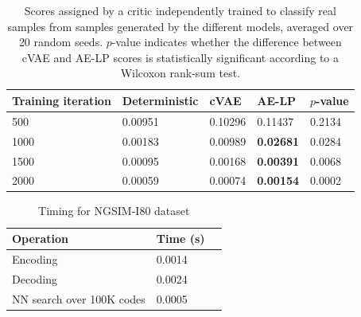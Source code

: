 \documentclass{article}
\begin{document}
\begin{table}
  \caption{Scores assigned by a critic independently trained to classify real samples from samples generated by the different models, averaged over 20 random seeds. $p$-value indicates whether the difference between cVAE and AE-LP scores is statistically significant according to a Wilcoxon rank-sum test.}
  \label{sample-table}
  \centering
  \begin{tabular}{l|l|lll}
    \toprule
    Training iteration     & Deterministic & cVAE & AE-LP & $p$-value \\
    \midrule
    500 & 0.00951 & 0.10296 & 0.11437 & 0.2134 \\
    1000 & 0.00183 & 0.00989 & \textbf{0.02681} & 0.0284 \\
    1500 & 0.00095 & 0.00168 & \textbf{0.00391} & 0.0068 \\
    2000 & 0.00059 & 0.00074 & \textbf{0.00154} & 0.0002 \\
    \bottomrule
  \end{tabular}
\end{table}


\begin{table}
  \caption{Timing for NGSIM-I80 dataset}
  \label{sample-table}
  \centering
  \begin{tabular}{lll}
    \toprule
    Operation     & Time (s) \\
    \midrule
    Encoding & 0.0014  \\
    Decoding     & 0.0024 \\
    NN search over 100K codes & 0.0005      \\
    \bottomrule
  \end{tabular}
\end{table}



%
%
%
%
%
%
\end{document}
